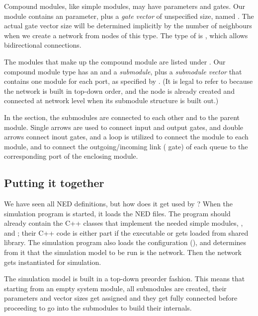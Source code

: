 Compound modules, like simple modules, may have parameters and gates.
Our  module contains an  parameter, plus a
\textit{gate vector} of unspecified size, named .
The actual gate vector size will be determined implicitly by the number
of neighbours when we create a network from nodes of this type.
The type of  is , which allows bidirectional
connections.

The modules that make up the compound module are listed under
. Our  compound module type has an  and
a  \textit{submodule}, plus a  \textit{submodule
vector} that contains one  module for each port, as specified by
. (It is legal to refer to  because
the network is built in top-down order, and the node is already created and
connected at network level when its submodule structure is built out.)

In the  section, the submodules are connected to each
other and to the parent module. Single arrows are used to connect input and
output gates, and double arrows connect inout gates, and a  loop
is utilized to connect the  module to each  module, and
to connect the outgoing/incoming link ( gate) of each queue to the
corresponding port of the enclosing module.


\subsection{Putting it together}

We have seen all NED definitions, but how does it get used by {\opp}? When
the simulation program is started, it loads the NED files. The program
should already contain the C++ classes that implement the needed simple
modules, ,  and ; their C++ code is either
part if the executable or gets loaded from shared library. The simulation
program also loads the configuration (), and determines
from it that the simulation model to be run is the  network.
Then the network gets instantiated for simulation.

The simulation model is built in a top-down preorder fashion. This means
that starting from an empty system module, all submodules are created,
their parameters and vector sizes get assigned and they get fully connected
before proceeding to go into the submodules to build their internals.

